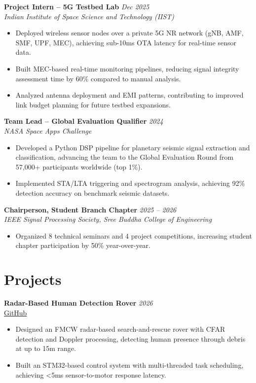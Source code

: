\documentclass[10pt,a4paper]{article}
\newcommand{\role}[2]{\textbf{#1} \hfill \textit{#2}}
\newcommand{\org}[2]{\textit{#1} \hfill #2}
\begin{document}
\role{Project Intern -- 5G Testbed Lab}{Dec 2025} \\
\org{Indian Institute of Space Science and Technology (IIST)}{}
\begin{itemize}
    \item Deployed wireless sensor nodes over a private 5G NR network (gNB, AMF, SMF, UPF, MEC), achieving sub-10ms OTA latency for real-time sensor data.
    \item Built MEC-based real-time monitoring pipelines, reducing signal integrity assessment time by 60\% compared to manual analysis.
    \item Analyzed antenna deployment and EMI patterns, contributing to improved link budget planning for future testbed expansions.
\end{itemize}

\role{Team Lead -- Global Evaluation Qualifier}{2024} \\
\org{NASA Space Apps Challenge}{}
\begin{itemize}
    \item Developed a Python DSP pipeline for planetary seismic signal extraction and classification, advancing the team to the Global Evaluation Round from 57,000+ participants worldwide (top 1\%).
    \item Implemented STA/LTA triggering and spectrogram analysis, achieving 92\% detection accuracy on benchmark seismic datasets.
\end{itemize}

\role{Chairperson, Student Branch Chapter}{2025 -- 2026} \\
\org{IEEE Signal Processing Society, Sree Buddha College of Engineering}{}
\begin{itemize}
    \item Organized 8 technical seminars and 4 project competitions, increasing student chapter participation by 50\% year-over-year.
\end{itemize}

\section*{Projects}

\role{Radar-Based Human Detection Rover}{2026} \\
\href{https://github.com/vass112}{GitHub}
\begin{itemize}
    \item Designed an FMCW radar-based search-and-rescue rover with CFAR detection and Doppler processing, detecting human presence through debris at up to 15m range.
    \item Built an STM32-based control system with multi-threaded task scheduling, achieving <5ms sensor-to-motor response latency.
\end{itemize}
\end{document}
